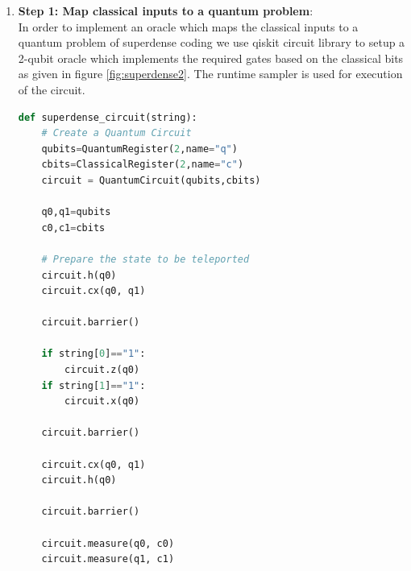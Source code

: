 \documentclass[12pt, oneside]{book}
\theoremstyle{definition}
\theoremstyle{definition}
\theoremstyle{remark}
\begin{document}
\begin{enumerate}
    \item \textbf{Step 1: Map classical inputs to a quantum problem}: \\
   In order to implement an oracle which maps the classical inputs to a quantum problem of superdense coding we use qiskit circuit library to setup a 2-qubit oracle which implements the required gates based on the classical bits as given in figure \ref{fig:superdense2}. The runtime sampler is used for execution of the circuit.
   
\begin{lstlisting}[language=Python]
def superdense_circuit(string):
    # Create a Quantum Circuit
    qubits=QuantumRegister(2,name="q")
    cbits=ClassicalRegister(2,name="c")
    circuit = QuantumCircuit(qubits,cbits)
    
    q0,q1=qubits
    c0,c1=cbits

    # Prepare the state to be teleported
    circuit.h(q0)
    circuit.cx(q0, q1)

    circuit.barrier()

    if string[0]=="1":
        circuit.z(q0)
    if string[1]=="1":
        circuit.x(q0)

    circuit.barrier()
    
    circuit.cx(q0, q1)
    circuit.h(q0)

    circuit.barrier()
    
    circuit.measure(q0, c0)
    circuit.measure(q1, c1)


\end{lstlisting}
\end{enumerate}
\end{document}
